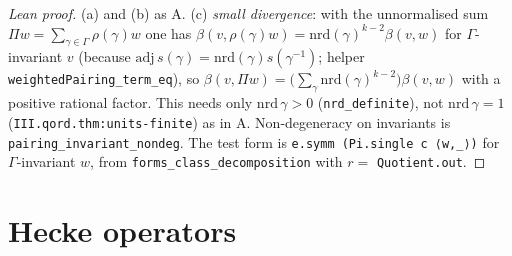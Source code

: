 \begin{proof}[Lean proof]
(a) and (b) as A. (c) \emph{small divergence}: with the unnormalised sum $\Pi w=\sum_{\gamma\in\Gamma}\rho(\gamma)w$ one has $\beta(v,\rho(\gamma)w)=\mathrm{nrd}(\gamma)^{k-2}\beta(v,w)$ for $\Gamma$-invariant $v$ (because $\mathrm{adj}\,s(\gamma)=\mathrm{nrd}(\gamma)s(\gamma^{-1})$; helper \texttt{weightedPairing\_term\_eq}), so $\beta(v,\Pi w)=\bigl(\sum_\gamma\mathrm{nrd}(\gamma)^{k-2}\bigr)\beta(v,w)$ with a positive rational factor. This needs only $\mathrm{nrd}\,\gamma>0$ (\texttt{nrd\_definite}), not $\mathrm{nrd}\,\gamma=1$ (\texttt{III.qord.thm:units-finite}) as in A. Non-degeneracy on invariants is \texttt{pairing\_invariant\_nondeg}. The test form is \texttt{e.symm (Pi.single c ⟨w,\_⟩)} for $\Gamma$-invariant $w$, from \texttt{forms\_class\_decomposition} with $r=$ \texttt{Quotient.out}.
\end{proof}

\section{Hecke operators}\label{sec:brandt-hecke}

